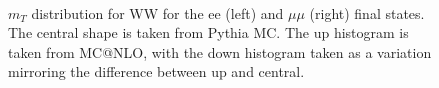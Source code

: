 \begin{figure}[!htbp]
\begin{center}
\\
\caption{$m_T$ distribution for WW for the ee (left) and $\mu\mu$ (right) final states. 
The central shape is taken from Pythia MC. The up histogram is taken from 
MC@NLO, with the down histogram taken as a variation mirroring the difference between up and central. 
}
\label{fig:wwsyst_hzz}
\end{center}
\begin{center}

\end{center}
\end{figure}
